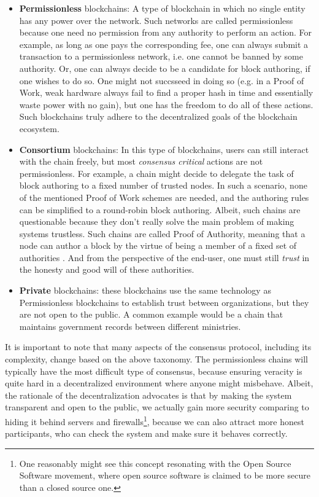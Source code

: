 \begin{itemize}
	\item \textbf{Permissionless} blockchains: A type of blockchain in which no single entity has
	any power over the network. Such networks are called permissionless because one need no
	permission from any authority to perform an action. For example, as long as one pays the
	corresponding fee, one can always submit a transaction to a permissionless network, i.e. one
	cannot be banned by some authority. Or, one can always decide to be a candidate for block
	authoring, if one wishes to do so. One might not succsseed in doing so (e.g. in a Proof of Work,
	weak hardware always fail to find a proper hash in time and essentially waste power with no
	gain), but one has the freedom to do all of these actions. Such blockchains truly adhere to the
	decentralized goals of the blockchain ecosystem.
	\item \textbf{Consortium} blockchains: In this type of blockchains, users can still interact
	with the chain freely, but most \textit{consensus critical} actions are not permissionless. For
	example, a chain might decide to delegate the task of block authoring to a fixed number of
	trusted nodes. In such a scenario, none of the mentioned Proof of Work schemes are needed, and
	the authoring rules can be simplified to a round-robin block authoring. Albeit, such chains are
	questionable because they don't really solve the main problem of making systems trustless. Such
	chains are called Proof of Authority, meaning that a node can author a block by the virtue of
	being a member of a fixed set of authorities \cite{deangelisPBFTVsProofofauthority2018}. And
	from the perspective of the end-user, one must still \textit{trust} in the honesty and good will
	of these authorities.
	\item \textbf{Private} blockchains: these blockchains use the same technology as Permissionless
	blockchains to establish trust between organizations, but they are not open to the public. A
	common example would be a chain that maintains government records between different ministries.
\end{itemize}

It is important to note that many aspects of the consensus protocol, including its complexity,
change based on the above taxonomy. The permissionless chains will typically have the most difficult
type of consensus, because ensuring veracity is quite hard in a decentralized environment where
anyone might misbehave. Albeit, the rationale of the decentralization advocates is that by making
the system transparent and open to the public, we actually gain more security comparing to hiding it
behind servers and firewalls\footnote{One reasonably might see this concept resonating with the Open
Source Software movement, where open source software is claimed to be more secure than a closed
source one.}, because we can also attract more honest participants, who can check the system and
make sure it behaves correctly.

